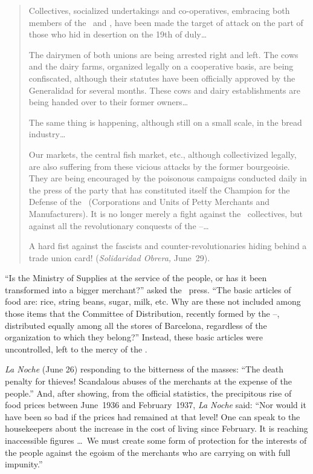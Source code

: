 \begin{quotation}
  Collectives, socialized undertakings and co-operatives, embracing both members of the \UGT\ and \CNT, have been made the target of attack on the part of those who hid in desertion on the 19th of duly\dots
  
  The dairymen of both unions are being arrested right and left. The cows and the dairy farms, organized legally on a cooperative basis, are being confiscated, although their statutes have been officially approved by the Generalidad for several months. These cows and dairy establishments are being hand\-ed over to their former owners\dots
  
  The same thing is happening, although still on a small scale, in the bread industry\dots
  
  Our markets, the central fish market, etc., although collectivized legally, are also suffering from these vicious attacks by the former bourgeoisie. They are being encouraged by the poisonous campaigns conducted daily in the press of the party that has constituted itself the Champion for the Defense of the \GEPCI\ (Corporations and Units of Petty Merchants and Manufacturers). It is no longer merely a fight against the \CNT\ collectives, but against all the revolutionary conquests of the \UGT--\CNT\dots

  A hard fist against the fascists and counter-revolutionaries hiding behind a trade union card! (\emph{Solidaridad Obrera,} June~29).\indexSolidaridadObrera
\end{quotation}

``Is the Ministry of Supplies at the service of the people, or has it been transformed into a bigger merchant?'' asked the \CNT\ press. ``The basic articles of food are: rice, string beans, sugar, milk, etc. Why are these not included among those items that the Committee of Distribution, recently formed by the \UGT--\CNT, distributed equally among all the stores of Barcelona, regardless of the organization to which they belong?'' Instead, these basic articles were uncontrolled, left to the mercy of the \GEPCI.

\emph{La Noche} (June 26) responding to the bitterness of the masses: ``The death penalty for thieves! Scandalous abuses of the merchants at the expense of the people.'' And, after showing, from the official statistics, the precipitous rise of food prices between June~1936 and February~1937, \emph{La Noche} said: ``Nor would it have been so bad if the prices had remained at that level! One can speak to the housekeepers about the increase in the cost of living since February. It is reaching inaccessible figures \dots\ We must create some form of protection for the interests of the people against the egoism of the merchants who are carrying on with full impunity.''

